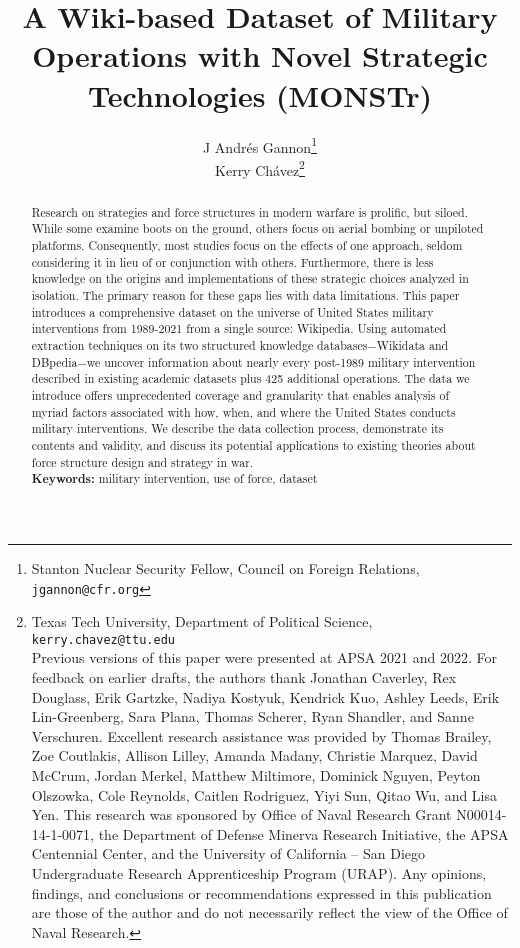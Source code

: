 \documentclass[fleqn,12pt]{article}
\title{\singlespacing A Wiki-based Dataset of Military Operations with Novel Strategic Technologies (MONSTr)}
\author{J Andr\'{e}s Gannon{\thanks{Stanton Nuclear Security Fellow, Council on Foreign Relations, \texttt{jgannon@cfr.org}}} \\ Kerry Ch\'{a}vez{\thanks{Texas Tech University, Department of Political Science, \texttt{kerry.chavez@ttu.edu} \\
Previous versions of this paper were presented at APSA 2021 and 2022. For feedback on earlier drafts, the authors thank Jonathan Caverley, Rex Douglass, Erik Gartzke, Nadiya Kostyuk, Kendrick Kuo, Ashley Leeds, Erik Lin-Greenberg, Sara Plana, Thomas Scherer, Ryan Shandler, and Sanne Verschuren. Excellent research assistance was provided by Thomas Brailey, Zoe Coutlakis, Allison Lilley, Amanda Madany, Christie Marquez, David McCrum, Jordan Merkel, Matthew Miltimore, Dominick Nguyen, Peyton Olszowka, Cole Reynolds, Caitlen Rodriguez, Yiyi Sun, Qitao Wu, and Lisa Yen. This research was sponsored by Office of Naval Research Grant N00014-14-1-0071, the Department of Defense Minerva Research Initiative, the APSA Centennial Center, and the University of California -- San Diego Undergraduate Research Apprenticeship Program (URAP). Any opinions, findings, and conclusions or recommendations expressed in this publication are those of the author and do not necessarily reflect the view of the Office of Naval Research.}}}
\date{}
\begin{document}
	\maketitle
	\thispagestyle{empty}
	\setcounter{page}{0}

	\begin{abstract}
		\singlespacing \noindent Research on strategies and force structures in modern warfare is prolific, but siloed. While some examine boots on the ground, others focus on aerial bombing or unpiloted platforms. Consequently, most studies focus on the effects of one approach, seldom considering it in lieu of or conjunction with others. Furthermore, there is less knowledge on the origins and implementations of these strategic choices analyzed in isolation. The primary reason for these gaps lies with data limitations. This paper introduces a comprehensive dataset on the universe of United States military interventions from 1989-2021 from a single source: Wikipedia. Using automated extraction techniques on its two structured knowledge databases$-$Wikidata and DBpedia$-$we uncover information about nearly every post-1989 military intervention described in existing academic datasets plus 425 additional operations. The data we introduce offers unprecedented coverage and granularity that enables analysis of myriad factors associated with how, when, and where the United States conducts military interventions. We describe the data collection process, demonstrate its contents and validity, and discuss its potential applications to existing theories about force structure design and strategy in war.\\

		\noindent
		\textbf{Keywords:} military intervention, use of force, dataset
	\end{abstract}
\end{document}
